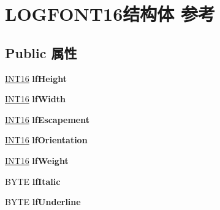 \hypertarget{struct_l_o_g_f_o_n_t16}{}\section{L\+O\+G\+F\+O\+N\+T16结构体 参考}
\label{struct_l_o_g_f_o_n_t16}
\subsection*{Public 属性}
\begin{DoxyCompactItemize}
\item 
\mbox{\label{struct_l_o_g_f_o_n_t16_a70c6425622c67263e37327e5a081d5cc}} 
\hyperlink{_processor_bind_8h_a30f500129d8c688af07726d5d34ce52d}{I\+N\+T16} {\bfseries lf\+Height}
\item 
\mbox{\label{struct_l_o_g_f_o_n_t16_a772786a200339b5a6806456b86d07bb4}} 
\hyperlink{_processor_bind_8h_a30f500129d8c688af07726d5d34ce52d}{I\+N\+T16} {\bfseries lf\+Width}
\item 
\mbox{\label{struct_l_o_g_f_o_n_t16_a73a8969c10bed15ed0a73de9347db338}} 
\hyperlink{_processor_bind_8h_a30f500129d8c688af07726d5d34ce52d}{I\+N\+T16} {\bfseries lf\+Escapement}
\item 
\mbox{\label{struct_l_o_g_f_o_n_t16_aac7d010c4593e00fd89f93514a7443f6}} 
\hyperlink{_processor_bind_8h_a30f500129d8c688af07726d5d34ce52d}{I\+N\+T16} {\bfseries lf\+Orientation}
\item 
\mbox{\label{struct_l_o_g_f_o_n_t16_a5bc4256249dcf25bda2e45f2d321284e}} 
\hyperlink{_processor_bind_8h_a30f500129d8c688af07726d5d34ce52d}{I\+N\+T16} {\bfseries lf\+Weight}
\item 
\mbox{\label{struct_l_o_g_f_o_n_t16_a98221a1406dd51ea53e09b16f3d3a466}} 
B\+Y\+TE {\bfseries lf\+Italic}
\item 
\mbox{\label{struct_l_o_g_f_o_n_t16_a41a854a981226c6ebea5dafd157ad887}} 
B\+Y\+TE {\bfseries lf\+Underline}
\item 
\mbox{\label{struct_l_o_g_f_o_n_t16_a07646afc5967e212cc268b223406fc40}} 

\end{DoxyCompactItemize}
